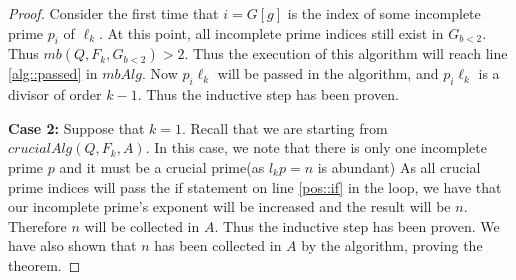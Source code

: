 \documentclass[../paper.tex]{subfiles}
\begin{document}
\begin{proof}
Consider the first time that $i = G[g]$ is the index of some
incomplete prime $p_i$ of $\ell_k$. At this point, 
all incomplete prime indices still exist in $G_{b<2}$. 
Thus $mb(Q, F_k, G_{b<2}) > 2$. Thus the execution of this
algorithm will reach line \ref{alg::passed} in $mbAlg$.
Now $p_i \ell_k$ will be passed in the algorithm, and $p_i \ell_k$
is a divisor of order $k-1$. Thus the inductive step has been proven.

\textbf{Case 2:} Suppose that $k = 1$. Recall that we are starting 
from $crucialAlg(Q,
F_k, A)$. In this case, we note that there is only one incomplete prime 
$p$ and it must be a crucial prime(as $l_k p = n$ is abundant)
As all crucial prime indices will pass the if statement on line
\ref{pos::if} in the 
loop, we have that our incomplete prime's exponent will be 
increased and the result will be $n$. Therefore $n$ will be 
collected in $A$. Thus the inductive step has 
been proven. We have also shown that $n$ has been
collected in $A$ by the algorithm, proving the theorem.
\end{proof}
\end{document}
